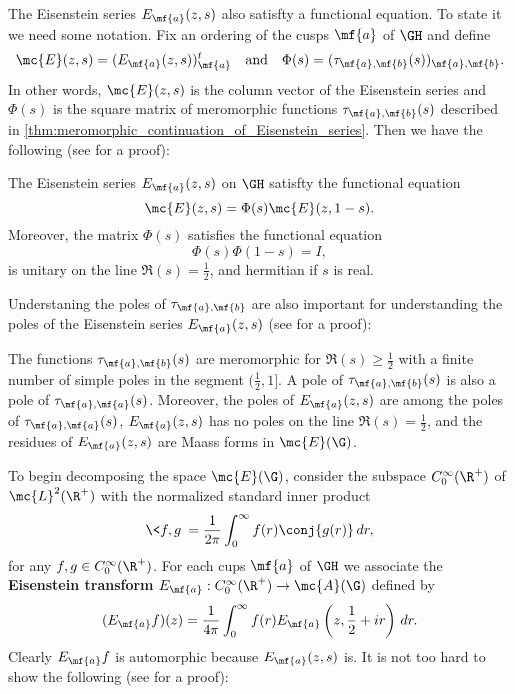     The Eisenstein series $E_{\mf{a}}(z,s)$ also satisfty a functional equation. To state it we need some notation. Fix an ordering of the cusps $\mf{a}$ of $\GH$ and define
    \[
      \mc{E}(z,s) = (E_{\mf{a}}(z,s))_{\mf{a}}^{t} \quad \text{and} \quad \Phi(s) = (\tau_{\mf{a},\mf{b}}(s))_{\mf{a},\mf{b}}.
    \]
    In other words, $\mc{E}(z,s)$ is the column vector of the Eisenstein series and $\Phi(s)$ is the square matrix of meromorphic functions $\tau_{\mf{a},\mf{b}}(s)$ described in \cref{thm:meromorphic_continuation_of_Eisenstein_series}. Then we have the following (see \cite{iwaniec2002spectral} for a proof): 

    \begin{theorem}\label{thm:functional_equation_of_Eisenstein_series}
      The Eisenstein series $E_{\mf{a}}(z,s)$ on $\GH$ satisfty the functional equation 
      \[
        \mc{E}(z,s) = \Phi(s)\mc{E}(z,1-s).
      \]
      Moreover, the matrix $\Phi(s)$ satisfies the functional equation
      \[
        \Phi(s)\Phi(1-s) = I,
      \]
      is unitary on the line $\Re(s) = \frac{1}{2}$, and hermitian if $s$ is real.
    \end{theorem}

    Understaning the poles of $\tau_{\mf{a},\mf{b}}$ are also important for understanding the poles of the Eisenstein series $E_{\mf{a}}(z,s)$ (see \cite{iwaniec2002spectral} for a proof):

    \begin{theorem}\label{thm:residues_of_Eisenstein_series}
      The functions $\tau_{\mf{a},\mf{b}}(s)$ are meromorphic for $\Re(s) \ge \frac{1}{2}$ with a finite number of simple poles in the segment $(\frac{1}{2},1]$. A pole of $\tau_{\mf{a},\mf{b}}(s)$ is also a pole of $\tau_{\mf{a},\mf{a}}(s)$. Moreover, the poles of $E_{\mf{a}}(z,s)$ are among the poles of $\tau_{\mf{a},\mf{a}}(s)$, $E_{\mf{a}}(z,s)$ has no poles on the line $\Re(s) = \frac{1}{2}$, and the residues of $E_{\mf{a}}(z,s)$ are Maass forms in $\mc{E}(\G)$.
    \end{theorem}

    To begin decomposing the space $\mc{E}(\G)$, consider the subspace $C_{0}^{\infty}(\R^{+})$ of $\mc{L}^{2}(\R^{+})$ with the normalized standard inner product
    \[
      \<f,g\> = \frac{1}{2\pi}\int_{0}^{\infty}f(r)\conj{g(r)}\,dr,
    \]
    for any $f,g \in C_{0}^{\infty}(\R^{+})$. For each cups $\mf{a}$ of $\GH$ we associate the \textbf{Eisenstein transform} $E_{\mf{a}}:C_{0}^{\infty}(\R^{+}) \to \mc{A}(\G)$ defined by
    \[
      (E_{\mf{a}}f)(z) = \frac{1}{4\pi}\int_{0}^{\infty}f(r)E_{\mf{a}}\left(z,\frac{1}{2}+ir\right)\,dr.
    \]
    Clearly $E_{\mf{a}}f$ is automorphic because $E_{\mf{a}}(z,s)$ is. It is not too hard to show the following (see \cite{iwaniec2002spectral} for a proof):

